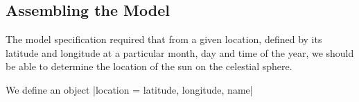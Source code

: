 \subsection{Assembling the Model}

The model specification required that from a given location, defined by its latitude and longitude at a particular month, day and time of the year, we should be able to determine the location of the sun on the celestial sphere.

We define an object |location = {latitude, longitude, name}| 











